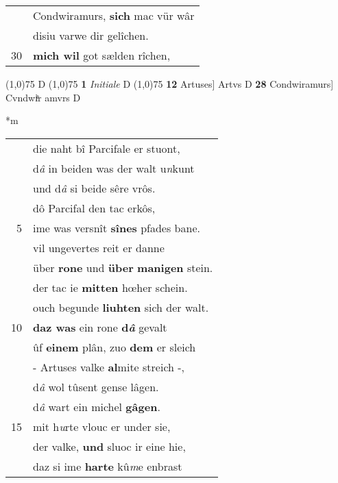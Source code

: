 \documentclass[8pt,a4paper,notitlepage]{article}
\begin{document}
\begin{table}[ht]
\begin{minipage}[t]{0.5\linewidth}
\begin{tabular}{rl}
 & Condwiramurs, \textbf{sich} mac vür wâr\\ 
 & disiu varwe dir gelîchen.\\ 
30 & \textbf{mich wil} got sælden rîchen,\\ 
\end{tabular}
\scriptsize
\line(1,0){75} \newline
D \newline
\line(1,0){75} \newline
\textbf{1} \textit{Initiale} D  \newline
\line(1,0){75} \newline
\textbf{12} Artuses] Artvs D \textbf{28} Condwiramurs] Cvndwiͤr amvrs D \newline
\end{minipage}
\hspace{0.5cm}
\begin{minipage}[t]{0.5\linewidth}
\small
\begin{center}*m
\end{center}
\begin{tabular}{rl}
 & die naht bî Parcifale er stuont,\\ 
 & d\textit{â} in beiden was der walt u\textit{n}kunt\\ 
 & und d\textit{â} si beide sêre vrôs.\\ 
 & dô Parcifal den tac erkôs,\\ 
5 & ime was versnît \textbf{sînes} pfades bane.\\ 
 & vil ungevertes reit er danne\\ 
 & über \textbf{rone} und \textbf{über} \textbf{manigen} stein.\\ 
 & der tac ie \textbf{mitten} hœher schein.\\ 
 & ouch begunde \textbf{liuhten} sich der walt.\\ 
10 & \textbf{daz was} ein rone \textbf{d\textit{â}} gevalt\\ 
 & ûf \textbf{einem} plân, zuo \textbf{dem} er sleich\\ 
 & - Artuses valke \textbf{al}mite streich -,\\ 
 & d\textit{â} wol tûsent gense lâgen.\\ 
 & d\textit{â} wart ein michel \textbf{gâgen}.\\ 
15 & mit h\textit{u}rte vlouc er under sie,\\ 
 & der valke, \textbf{und} sluoc ir eine hie,\\ 
 & daz si ime \textbf{harte} kû\textit{m}e enbrast\\ 

\end{tabular}
\end{minipage}
\end{table}
\end{document}
